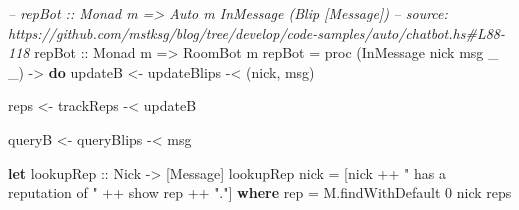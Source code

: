 \documentclass[]{article}
\newenvironment{Shaded}{}{}
\newcommand{\KeywordTok}[1]{\textcolor[rgb]{0.00,0.44,0.13}{\textbf{{#1}}}}
\newcommand{\DataTypeTok}[1]{\textcolor[rgb]{0.56,0.13,0.00}{{#1}}}
\newcommand{\DecValTok}[1]{\textcolor[rgb]{0.25,0.63,0.44}{{#1}}}
\newcommand{\StringTok}[1]{\textcolor[rgb]{0.25,0.44,0.63}{{#1}}}
\newcommand{\CommentTok}[1]{\textcolor[rgb]{0.38,0.63,0.69}{\textit{{#1}}}}
\newcommand{\OtherTok}[1]{\textcolor[rgb]{0.00,0.44,0.13}{{#1}}}
\newcommand{\FunctionTok}[1]{\textcolor[rgb]{0.02,0.16,0.49}{{#1}}}
\newcommand{\NormalTok}[1]{{#1}}
\begin{document}
\begin{Shaded}
\begin{Highlighting}[]
\CommentTok{-- repBot :: Monad m => Auto m InMessage (Blip [Message])}
\CommentTok{-- source: https://github.com/mstksg/blog/tree/develop/code-samples/auto/chatbot.hs#L88-118}
\OtherTok{repBot ::} \DataTypeTok{Monad} \NormalTok{m }\OtherTok{=>} \DataTypeTok{RoomBot} \NormalTok{m}
\NormalTok{repBot }\FunctionTok{=} \NormalTok{proc (}\DataTypeTok{InMessage} \NormalTok{nick msg _ _) }\OtherTok{->} \KeywordTok{do}
    \NormalTok{updateB }\OtherTok{<-} \NormalTok{updateBlips }\FunctionTok{-<} \NormalTok{(nick, msg)}

    \NormalTok{reps    }\OtherTok{<-} \NormalTok{trackReps   }\FunctionTok{-<} \NormalTok{updateB}

    \NormalTok{queryB  }\OtherTok{<-} \NormalTok{queryBlips  }\FunctionTok{-<} \NormalTok{msg}

    \KeywordTok{let}\OtherTok{ lookupRep ::} \DataTypeTok{Nick} \OtherTok{->} \NormalTok{[}\DataTypeTok{Message}\NormalTok{]}
        \NormalTok{lookupRep nick }\FunctionTok{=} \NormalTok{[nick }\FunctionTok{++} \StringTok{" has a reputation of "} \FunctionTok{++} \NormalTok{show rep }\FunctionTok{++} \StringTok{"."}\NormalTok{]}
          \KeywordTok{where}
            \NormalTok{rep }\FunctionTok{=} \NormalTok{M.findWithDefault }\DecValTok{0} \NormalTok{nick reps}


\end{Highlighting}
\end{Shaded}
\end{document}
